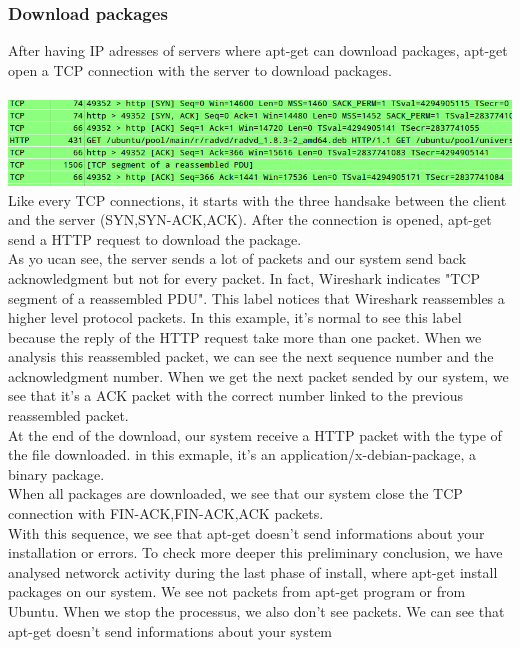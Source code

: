 \documentclass[twoside]{article}
\begin{document}
\begin{multicols}{2}
\subsubsection{Download packages}
After having IP adresses of servers where apt-get can download packages, apt-get open a TCP connection with the server to download packages.\\ \\ \includegraphics[scale=0.27]{pictures/install_download.png}
Like every TCP connections, it starts with the three handsake between the client and the server (SYN,SYN-ACK,ACK).  After the connection is opened, apt-get send a HTTP request to download the package.\\
As yo ucan see, the server sends a lot of packets and our system send back acknowledgment but not for every packet.  In fact, Wireshark indicates "TCP segment of a reassembled PDU".  This label notices that Wireshark reassembles a higher level protocol packets.  In this example, it's normal to see this label because the reply of the HTTP request take more than one packet.  When we analysis this reassembled packet, we can see the next sequence number and the acknowledgment number.  When we get the next packet sended by our system, we see that it's a ACK packet with the correct number linked to the previous reassembled packet.\\
At the end of the download, our system receive a HTTP packet with the type of the file downloaded.  in this exmaple, it's an application/x-debian-package, a binary package.\\
When all packages are downloaded, we see that our system close the TCP connection with FIN-ACK,FIN-ACK,ACK packets.\\  With this sequence, we see that apt-get doesn't send informations about your installation or errors.  To check more deeper this preliminary conclusion, we have analysed networck activity during the last phase of install, where apt-get install packages on our system.  We see not packets from apt-get program or from Ubuntu.  When we stop the processus, we also don't see packets.  We can see that apt-get doesn't send informations about your system\\

\end{multicols}
\end{document}

